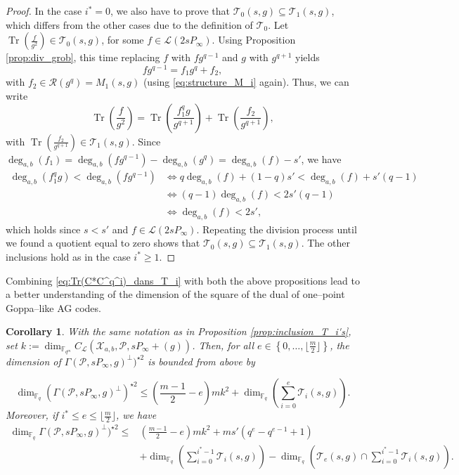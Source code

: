 \documentclass[a4paper]{amsart}
\newtheorem{coro}[thm]{Corollary}
\theoremstyle{definition}
\theoremstyle{remark}
\newcommand{\calP}{\mathcal{P}}
\newcommand{\calL}{\mathcal{L}}
\newcommand{\calR}{\mathcal{R}}
\newcommand{\calT}{\mathcal{T}}
\newcommand{\calX}{\mathcal{X}}
\newcommand{\fqm}{\mathbb{F}_{q^m}}
\newcommand{\fq}{\mathbb{F}_{q}}
\newcommand{\Tr}[1]{\operatorname{Tr}\left(#1\right)}
\newcommand{\set}[1]{\left\{#1\right\}}
\newcommand{\degab}[1]{\deg_{a,b}\left(#1\right)}
\begin{document}
\begin{proof}
In the case $i^*=0$, we also have to prove that $\calT_0(s,g) \subseteq \calT_1(s,g)$, which differs from the other cases due to the definition of $\calT_0$. Let $\Tr{\frac{f}{g^2}} \in \calT_0(s,g)$, for some $f \in \calL(2sP_\infty)$. Using Proposition \ref{prop:div_grob}, this time replacing $f$ with $fg^{q-1}$ and $g$ with $g^{q+1}$ yields
$$fg^{q-1} = f_1g^q + f_2,$$ with $f_2 \in \calR(g^q) = M_1(s,g)$ (using \eqref{eq:structure_M_i} again).
Thus, we can write
    $$ \Tr{\frac{f}{g^2}} = \Tr{\frac{f_1^qg}{g^{q+1}}}  + \Tr{\frac{f_2}{g^{q+1}}}, $$
with $\Tr{\frac{f_2}{g^{q+1}}} \in \calT_1(s,g)$. Since $\degab{f_1} = \degab{fg^{q-1}} - \degab{g^q} = \degab{f}-s'$, we have 
\begin{align*}
     \degab{f_1^qg} < \degab{fg^{q-1}} & \iff q\degab{f} +(1-q)s' < \degab{f} + s'(q-1)\\
                                               & \iff (q-1)\degab{f} < 2s'(q-1)\\
                                               & \iff \degab{f} < 2s',
\end{align*}
which holds since $s<s'$ and $f \in \calL(2sP_\infty)$. Repeating the division process until we found a quotient equal to zero shows that $\calT_0(s,g) \subseteq \calT_1(s,g)$. The other inclusions hold as in the case $i^* \geq 1$.
\end{proof}
Combining \eqref{eq:Tr(C*C^q^i)_dans_T_i} with both the above propositions lead to a better understanding of the dimension of the square of the dual of one--point Goppa--like AG codes. 
\begin{coro} \label{coro:folklore_upper_bound}
 With the same notation as in Proposition \ref{prop:inclusion_T_i's}, set $k:=\dim_{\fqm}C_{\calL}(\calX_{a,b},\calP,sP_\infty+(g))$.
 Then, for all $e \in \set{0,\dots,\lfloor \frac{m}{2} \rfloor}$, the dimension of $\Gamma(\calP,sP_\infty,g)^{\perp})^{\star 2}$ is bounded from above by
 
\[\dim_{\fq} \left(\Gamma(\calP,sP_\infty,g)^{\perp}\right)^{\star 2} \leq   \left(\frac{m-1}{2}-e\right)mk^2+\dim_{\fq}\left(\sum\limits_{i=0}^e \calT_i(s,g) \right). \]
 Moreover, if $i^* \leq e \leq \lfloor \frac{m}{2} \rfloor$, we have 
 \begin{align*}
  \dim_{\fq} \Gamma(\calP,sP_\infty,g)^{\perp})^{\star 2} \leq   & \left(\frac{m-1}{2}-e\right)mk^2 + ms'(q^e-q^{e-1}+1) \\
  & + \dim_{\fq}\left(\sum\limits_{i=0}^{i^*-1} \calT_i(s,g)\right) - \dim_{\fq} \left( \calT_e(s,g) \cap   \sum\limits_{i=0}^{i^*-1} \calT_i(s,g)\right).
 \end{align*}

\end{coro}
\end{document}

